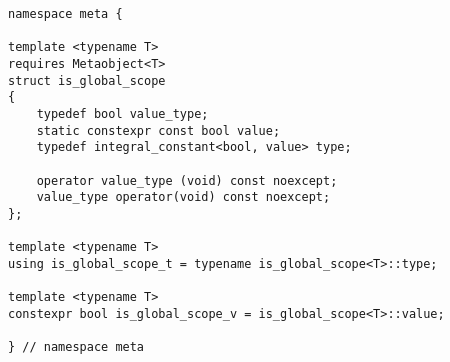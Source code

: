 
\begin{verbatim}
namespace meta {

template <typename T>
requires Metaobject<T>
struct is_global_scope
{
	typedef bool value_type;
	static constexpr const bool value;
	typedef integral_constant<bool, value> type;

	operator value_type (void) const noexcept;
	value_type operator(void) const noexcept;
};

template <typename T>
using is_global_scope_t = typename is_global_scope<T>::type;

template <typename T>
constexpr bool is_global_scope_v = is_global_scope<T>::value;

} // namespace meta
\end{verbatim}
